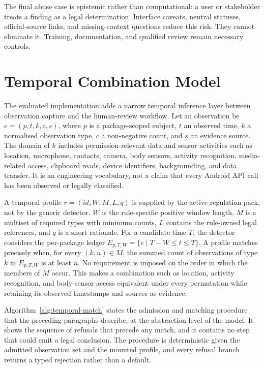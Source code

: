 The final abuse case is epistemic rather than computational: a user or stakeholder treats a finding as a legal determination. Interface caveats, neutral statuses, official-source links, and missing-context questions reduce this risk. They cannot eliminate it. Training, documentation, and qualified review remain necessary controls.

\section{Temporal Combination Model}

The evaluated implementation adds a narrow temporal inference layer between observation capture and the human-review workflow. Let an observation be $e=(p,t,k,c,s)$, where $p$ is a package-scoped subject, $t$ an observed time, $k$ a normalised observation type, $c$ a non-negative count, and $s$ an evidence source. The domain of $k$ includes permission-relevant data and sensor activities such as location, microphone, contacts, camera, body sensors, activity recognition, media-related access, clipboard reads, device identifiers, backgrounding, and data transfer. It is an engineering vocabulary, not a claim that every Android API call has been observed or legally classified.

A temporal profile $r=(id,W,M,L,q)$ is supplied by the active regulation pack, not by the generic detector. $W$ is the rule-specific positive window length, $M$ is a multiset of required types with minimum counts, $L$ contains the rule-owned legal references, and $q$ is a short rationale. For a candidate time $T$, the detector considers the per-package ledger $E_{p,T,W}=\{e \mid T-W \leq t \leq T\}$. A profile matches precisely when, for every $(k,n)\in M$, the summed count of observations of type $k$ in $E_{p,T,W}$ is at least $n$. No requirement is imposed on the order in which the members of $M$ occur. This makes a combination such as location, activity recognition, and body-sensor access equivalent under every permutation while retaining its observed timestamps and sources as evidence.

Algorithm~\ref{alg:temporal-match} states the admission and matching procedure that the preceding paragraphs describe, at the abstraction level of the model. It shows the sequence of refusals that precede any match, and it contains no step that could emit a legal conclusion. The procedure is deterministic given the admitted observation set and the mounted profile, and every refusal branch returns a typed rejection rather than a default.

